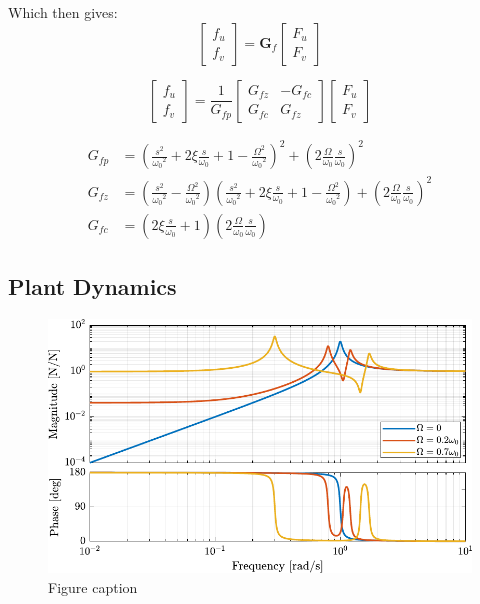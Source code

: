 \documentclass{ISMA_USD2020}
\begin{document}
Which then gives:
\begin{equation}
\begin{bmatrix} f_{u} \\ f_{v} \end{bmatrix} =
\bm{G}_{f}
\begin{bmatrix} F_u \\ F_v \end{bmatrix}
\end{equation}

\begin{equation}
\begin{bmatrix} f_{u} \\ f_{v} \end{bmatrix} =
\frac{1}{G_{fp}}
\begin{bmatrix}
  G_{fz} & -G_{fc} \\
  G_{fc} &  G_{fz}
\end{bmatrix}
\begin{bmatrix} F_u \\ F_v \end{bmatrix}
\end{equation}

\begin{align}
  G_{fp} &= \left( \frac{s^2}{{\omega_0}^2} + 2 \xi \frac{s}{\omega_0} + 1 - \frac{{\Omega}^2}{{\omega_0}^2} \right)^2 + \left( 2 \frac{\Omega}{\omega_0} \frac{s}{\omega_0} \right)^2 \\
  G_{fz} &= \left( \frac{s^2}{{\omega_0}^2} - \frac{\Omega^2}{{\omega_0}^2} \right) \left( \frac{s^2}{{\omega_0}^2} + 2 \xi \frac{s}{\omega_0} + 1 - \frac{{\Omega}^2}{{\omega_0}^2} \right) + \left( 2 \frac{\Omega}{\omega_0} \frac{s}{\omega_0} \right)^2 \\
  G_{fc} &= \left( 2 \xi \frac{s}{\omega_0} + 1 \right) \left( 2 \frac{\Omega}{\omega_0} \frac{s}{\omega_0} \right)
\end{align}

\subsection{Plant Dynamics}
\label{sec:org1e476e3}

\begin{figure}[htbp]
\centering
\includegraphics[scale=1]{figs/plant_iff_compare_rotating_speed.pdf}
\caption{\label{fig:plant_iff_compare_rotating_speed}Figure caption}
\end{figure}
\end{document}
